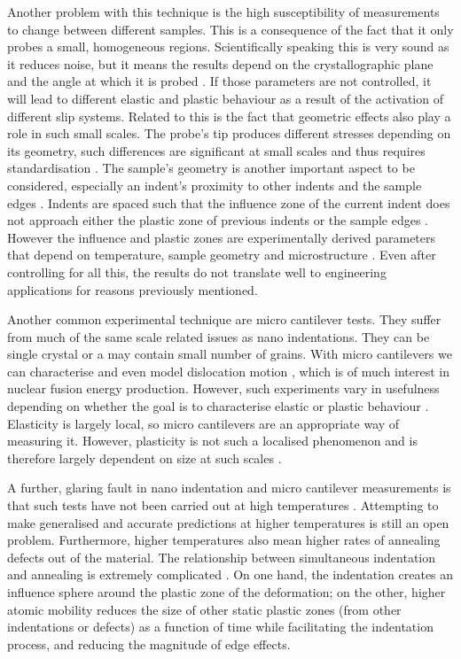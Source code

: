 \documentclass[12pt, a4paper]{article}
\begin{document}
		Another problem with this technique is the high susceptibility of measurements to change between different samples. This is a consequence of the fact that it only probes a small, homogeneous regions. Scientifically speaking this is very sound as it reduces noise, but it means the results depend on the crystallographic plane and the angle at which it is probed \cite{ionirrmic,nanointorient}. If those parameters are not controlled, it will lead to different elastic and plastic behaviour as a result of the activation of different slip systems. Related to this is the fact that geometric effects also play a role in such small scales. The probe's tip produces different stresses depending on its geometry, such differences are significant at small scales and thus requires standardisation \cite{tipgeom}. The sample's geometry is another important aspect to be considered, especially an indent's proximity to other indents and the sample edges \cite{nanoindent2}. Indents are spaced such that the influence zone of the current indent does not approach either the plastic zone of previous indents or the sample edges \cite{nanoindent1}. However the influence and plastic zones are experimentally derived parameters that depend on temperature, sample geometry and microstructure \cite{plasticzone}. Even after controlling for all this, the results do not translate well to engineering applications for reasons previously mentioned.
		
		Another common experimental technique are micro cantilever tests. They suffer from much of the same scale related issues as nano indentations. They can be single crystal or a may contain small number of grains. With micro cantilevers we can characterise and even model dislocation motion \cite{dismot}, which is of much interest in nuclear fusion energy production. However, such experiments vary in usefulness depending on whether the goal is to characterise elastic or plastic behaviour \cite{microcant}. Elasticity is largely local, so micro cantilevers are an appropriate way of measuring it. However, plasticity is not such a localised phenomenon and is therefore largely dependent on size at such scales \cite{sizeeff}.
				
		A further, glaring fault in nano indentation and micro cantilever measurements is that such tests have not been carried out at high temperatures \cite{cant}. Attempting to make generalised and accurate predictions at higher temperatures is still an open problem. Furthermore, higher temperatures also mean higher rates of annealing defects out of the material. The relationship between simultaneous indentation and annealing is extremely complicated \cite{hotnanoindent}. On one hand, the indentation creates an influence sphere around the plastic zone of the deformation; on the other, higher atomic mobility reduces the size of other static plastic zones (from other indentations or defects) as a function of time while facilitating the indentation process, and reducing the magnitude of edge effects.
\end{document}
